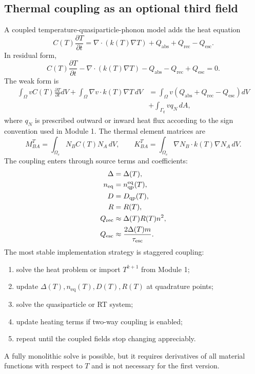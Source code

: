 \documentclass[11pt]{article}
\newcommand{\esc}{\mathrm{esc}}
\newcommand{\rec}{\mathrm{rec}}
\newcommand{\eq}{\mathrm{eq}}
\begin{document}
\subsection{Thermal coupling as an optional third field}
A coupled temperature-quasiparticle-phonon model adds the heat equation
\begin{equation}
C(T)\frac{\partial T}{\partial t}=\nabla\cdot(k(T)\nabla T)+Q_{\mathrm{abs}}+Q_{\rec}-Q_{\esc}.
\label{eq:fem_temperature_strong_module2}
\end{equation}
In residual form,
\begin{equation}
C(T)\frac{\partial T}{\partial t}-\nabla\cdot(k(T)\nabla T)-Q_{\mathrm{abs}}-Q_{\rec}+Q_{\esc}=0.
\end{equation}
The weak form is
\begin{align}
\int_{\Omega}v C(T)\frac{\partial T}{\partial t}dV
+\int_{\Omega}\nabla v\cdot k(T)\nabla T\,dV
&=\int_{\Omega}v\left(Q_{\mathrm{abs}}+Q_{\rec}-Q_{\esc}\right)dV \\
&+\int_{\Gamma_q}v q_N\,dA,
\end{align}
where $q_N$ is prescribed outward or inward heat flux according to the sign convention used in Module 1. The thermal element matrices are
\begin{equation}
M^T_{BA}=\int_{\Omega_e}N_B C(T)N_A\,dV,
\qquad
K^T_{BA}=\int_{\Omega_e}\nabla N_B\cdot k(T)\nabla N_A\,dV.
\end{equation}
The coupling enters through source terms and coefficients:
\begin{align}
\Delta&=\Delta(T),\\
n_{\eq}&=n_{\qp}^{\eq}(T),\\
D&=D_{\qp}(T),\\
R&=R(T),\\
Q_{\rec}&\approx \Delta(T)R(T)n^2,\\
Q_{\esc}&\approx \frac{2\Delta(T)m}{\tau_{\esc}}.
\end{align}
The most stable implementation strategy is staggered coupling:
\begin{enumerate}[leftmargin=1.6em]
    \item solve the heat problem or import $T^{k+1}$ from Module 1;
    \item update $\Delta(T),n_{\eq}(T),D(T),R(T)$ at quadrature points;
    \item solve the quasiparticle or RT system;
    \item update heating terms if two-way coupling is enabled;
    \item repeat until the coupled fields stop changing appreciably.
\end{enumerate}
A fully monolithic solve is possible, but it requires derivatives of all material functions with respect to $T$ and is not necessary for the first version.
\end{document}
